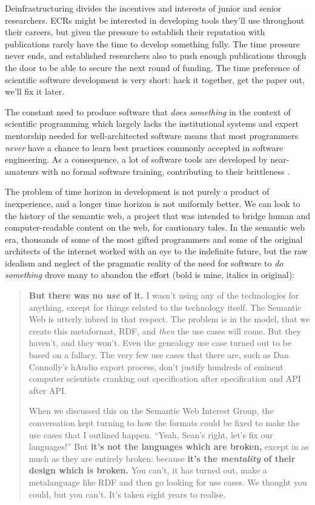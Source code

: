 \documentclass[10pt]{tufte-book}
\begin{document}
Deinfrastructuring divides the incentives and interests of junior and
senior researchers. ECRs might be interested in developing tools they'll
use throughout their careers, but given the pressure to establish their
reputation with publications rarely have the time to develop something
fully. The time pressure never ends, and established researchers also to
push enough publications through the door to be able to secure the next
round of funding. The time preference of scientific software development
is very short: hack it together, get the paper out, we'll fix it later.

The constant need to produce software that \emph{does something} in the
context of scientific programming which largely lacks the institutional
systems and expert mentorship needed for well-architected software means
that most programmers \emph{never} have a chance to learn best practices
commonly accepted in software engineering. As a consequence, a lot of
software tools are developed by near-amateurs with no formal software
training, contributing to their brittleness \citep{altschulAnatomySuccessfulComputational2013} .

The problem of time horizon in development is not purely a product of
inexperience, and a longer time horizon is not uniformly better. We can
look to the history of the semantic web, a project that was intended to
bridge human and computer-readable content on the web, for cautionary
tales. In the semantic web era, thousands of some of the most gifted
programmers and some of the original architects of the internet worked
with an eye to the indefinite future, but the raw idealism and neglect
of the pragmatic reality of the need for software to \emph{do something}
drove many to abandon the effort (bold is mine, italics in original):

\begin{quote}
\textbf{But there was no \emph{use} of it.} I wasn't using any of the
technologies for anything, except for things related to the technology
itself. The Semantic Web is utterly inbred in that respect. The problem
is in the model, that we create this metaformat, RDF, and \emph{then}
the use cases will come. But they haven't, and they won't. Even the
genealogy use case turned out to be based on a fallacy. The very few use
cases that there are, such as Dan Connolly's hAudio export process,
don't justify hundreds of eminent computer scientists cranking out
specification after specification and API after API.

When we discussed this on the Semantic Web Interest Group, the
conversation kept turning to how the formats could be fixed to make the
use cases that I outlined happen. ``Yeah, Sean's right, let's fix our
languages!'' But \textbf{it's not the languages which are broken,}
except in as much as they are entirely broken: because \textbf{it's the
\emph{mentality} of their design which is broken.} You can't, it has
turned out, make a metalanguage like RDF and then go looking for use
cases. We thought you could, but you can't. It's taken eight years to
realise. \citep{palmerDitchingSemanticWeb2008} 
\end{quote}
\end{document}
